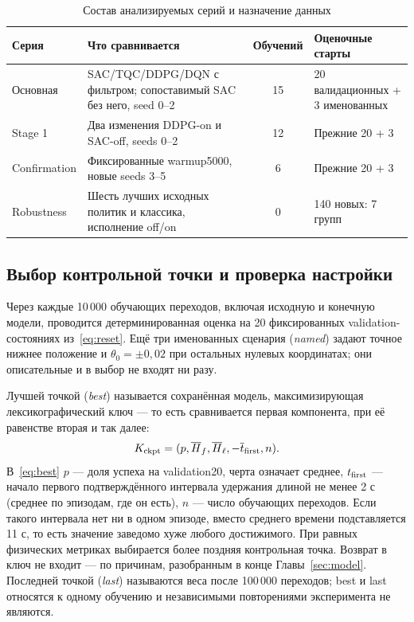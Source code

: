 \begin{table}[htbp]\caption{Состав анализируемых серий и назначение данных}\label{tab:series}
\begin{smalltable}\begin{tabularx}{\linewidth}{@{}p{22mm} X c p{37mm}@{}}\toprule
Серия & Что сравнивается & Обучений & Оценочные старты\\\midrule
Основная & SAC/TQC/DDPG/DQN с фильтром; сопоставимый SAC без него, seed 0–2 & 15 & 20 валидационных + 3 именованных\\
Stage 1 & Два изменения DDPG-on и SAC-off, seeds 0–2 & 12 & Прежние 20 + 3\\
Confirmation & Фиксированные warmup5000, новые seeds 3–5 & 6 & Прежние 20 + 3\\
Robustness & Шесть лучших исходных политик и классика, исполнение off/on & 0 & 140 новых: 7 групп\\\bottomrule
\end{tabularx}\end{smalltable}\end{table}

\subsection{Выбор контрольной точки и проверка настройки}
Через каждые 10\,000 обучающих переходов, включая исходную и конечную модели, проводится детерминированная оценка на 20 фиксированных validation-состояниях из~\eqref{eq:reset}. Ещё три именованных сценария (\emph{named}) задают точное нижнее положение и $\theta_0=\pm0{,}02$ при остальных нулевых координатах; они описательные и в выбор не входят ни разу.

Лучшей точкой (\emph{best}) называется сохранённая модель, максимизирующая лексикографический ключ — то есть сравнивается первая компонента, при её равенстве вторая и так далее:
\begin{equation}
K_{\rm ckpt}=(p,\overline H_f,\overline H_\ell,-\overline t_{\rm first},n).
\label{eq:best}
\end{equation}
В~\eqref{eq:best} $p$ — доля успеха на validation20, черта означает среднее, $t_{\rm first}$ — начало первого подтверждённого интервала удержания длиной не менее 2 с (среднее по эпизодам, где он есть), $n$ — число обучающих переходов. Если такого интервала нет ни в одном эпизоде, вместо среднего времени подставляется 11 с, то есть значение заведомо хуже любого достижимого. При равных физических метриках выбирается более поздняя контрольная точка. Возврат в ключ не входит — по причинам, разобранным в конце Главы~\ref{sec:model}. Последней точкой (\emph{last}) называются веса после 100\,000 переходов; best и last относятся к одному обучению и независимыми повторениями эксперимента не являются.

